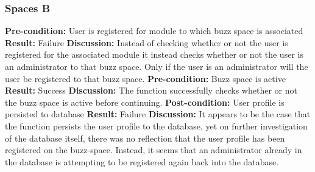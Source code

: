 
\subsubsection{Spaces B}
\textbf{Pre-condition:} User is registered for module to which buzz space is associated \newline
\textbf{Result:} Failure\newline
\textbf{Discussion:}  Instead of checking whether or not the user is registered for the associated module it instead checks whether or not the user is an administrator to that buzz space. Only if the user is an administrator will the user be registered to that buzz space.
\newline \newline
\textbf{Pre-condition:}  Buzz space is active\newline
\textbf{Result:} Success\newline
\textbf{Discussion:} The function successfully checks whether or not the buzz space is active before continuing. 
\newline \newline
\textbf{Post-condition:} User profile is persisted to database \newline
\textbf{Result:} Failure\newline
\textbf{Discussion:} It appears to be the case that the function persists the user profile to the database, yet on further investigation of the database itself, there was no reflection that the user profile has been registered on the buzz-space. Instead, it seems that an administrator already in the database is attempting to be registered again back into the database.